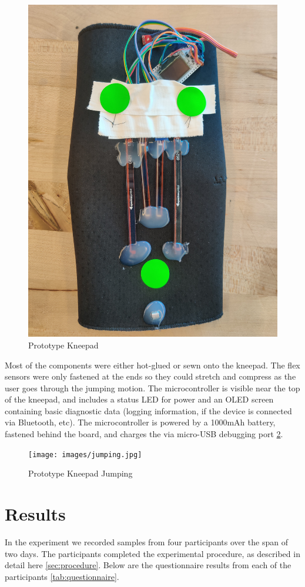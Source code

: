 \documentclass[manuscript,screen,review]{acmart}
\begin{document}
\begin{figure}[ht]
  \centering
  \includegraphics[width=0.5\linewidth]{images/on_table.jpg}
  \caption{Prototype Kneepad}
  \label{fig:table_kneepad}
\end{figure}

Most of the components were either hot-glued or sewn onto the kneepad. The flex sensors were only fastened at the ends so they could stretch and compress as the user goes through the jumping motion. The microcontroller is visible near the top of the kneepad, and includes a status LED for power and an OLED screen containing basic diagnostic data (logging information, if the device is connected via Bluetooth, etc). The microcontroller is powered by a 1000mAh battery, fastened behind the board, and charges the via micro-USB debugging port \ref{fig:jumping_kneepad}.

\begin{figure}[ht]
  \centering
  \texttt{[image: images/jumping.jpg]}
  \caption{Prototype Kneepad Jumping}
  \label{fig:jumping_kneepad}
\end{figure}

\section{Results} \label{sec:results}

In the experiment we recorded samples from four participants over the span of two days. The participants completed the experimental procedure, as described in detail here \ref{sec:procedure}. Below are the questionnaire results from each of the participants \ref{tab:questionnaire}.
\end{document}
